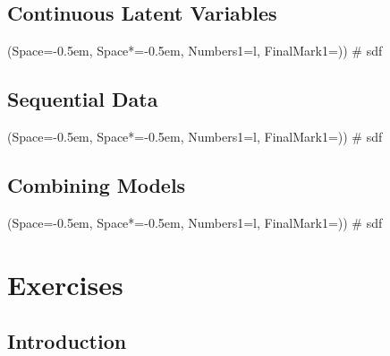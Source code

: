 \documentclass[12pt, a4paper]{article}
\newcommand{\listSpace}{-0.5em}%
\begin{document}
\subsection{Continuous Latent Variables}
\begin{easylist}[itemize]
	\ListProperties(Space=\listSpace, Space*=\listSpace, Numbers1=l, FinalMark1={)})
	# sdf
\end{easylist}

\subsection{Sequential Data}
\begin{easylist}[itemize]
	\ListProperties(Space=\listSpace, Space*=\listSpace, Numbers1=l, FinalMark1={)})
	# sdf
\end{easylist}

\subsection{Combining Models}
\begin{easylist}[itemize]
	\ListProperties(Space=\listSpace, Space*=\listSpace, Numbers1=l, FinalMark1={)})
	# sdf
\end{easylist}

















\clearpage
\section{Exercises}

\subsection{Introduction}
\end{document}
